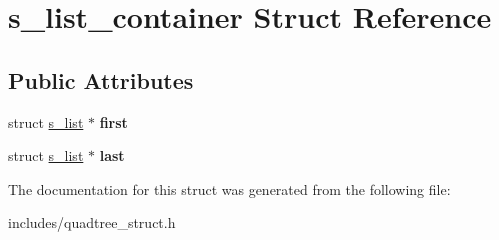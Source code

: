 \hypertarget{structs__list__container}{}\section{s\+\_\+list\+\_\+container Struct Reference}
\label{structs__list__container}
\subsection*{Public Attributes}
\begin{DoxyCompactItemize}
\item 
\mbox{\label{structs__list__container_a5862d48faa7e8601231090b86f586ba2}} 
struct \hyperlink{structs__list}{s\+\_\+list} $\ast$ {\bfseries first}
\item 
\mbox{\label{structs__list__container_ac34689b6288fa0f4334c412671ab7266}} 
struct \hyperlink{structs__list}{s\+\_\+list} $\ast$ {\bfseries last}
\end{DoxyCompactItemize}


The documentation for this struct was generated from the following file\+:\begin{DoxyCompactItemize}
\item 
includes/quadtree\+\_\+struct.\+h\end{DoxyCompactItemize}
